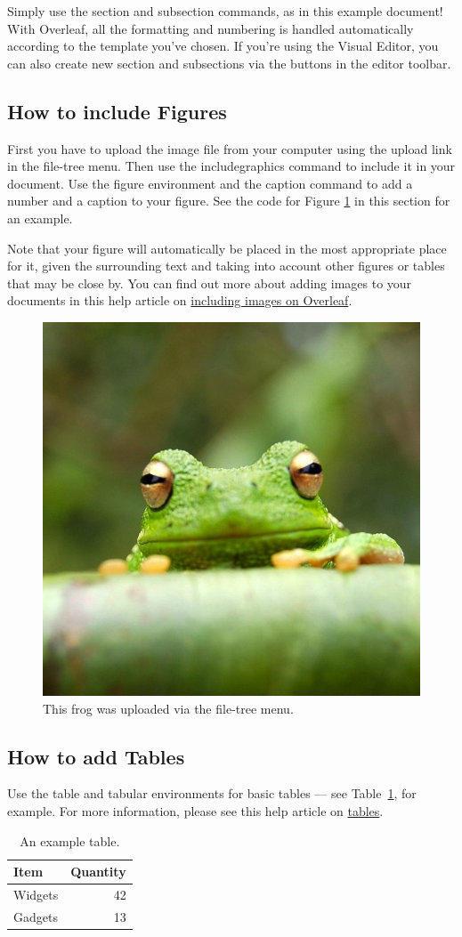 \documentclass{article}
\begin{document}
Simply use the section and subsection commands, as in this example document! With Overleaf, all the formatting and numbering is handled automatically according to the template you've chosen. If you're using the Visual Editor, you can also create new section and subsections via the buttons in the editor toolbar.

\subsection{How to include Figures}

First you have to upload the image file from your computer using the upload link in the file-tree menu. Then use the includegraphics command to include it in your document. Use the figure environment and the caption command to add a number and a caption to your figure. See the code for Figure \ref{fig:frog} in this section for an example.

Note that your figure will automatically be placed in the most appropriate place for it, given the surrounding text and taking into account other figures or tables that may be close by. You can find out more about adding images to your documents in this help article on \href{https://www.overleaf.com/learn/how-to/Including_images_on_Overleaf}{including images on Overleaf}.

\begin{figure}
\centering
\includegraphics[width=0.25\linewidth]{frog.jpg}
\caption{\label{fig:frog}This frog was uploaded via the file-tree menu.}
\end{figure}

\subsection{How to add Tables}

Use the table and tabular environments for basic tables --- see Table~\ref{tab:widgets}, for example. For more information, please see this help article on \href{https://www.overleaf.com/learn/latex/tables}{tables}.

\begin{table}
\centering
\begin{tabular}{l|r}
Item & Quantity \\\hline
Widgets & 42 \\
Gadgets & 13
\end{tabular}
\caption{\label{tab:widgets}An example table.}
\end{table}
\end{document}
